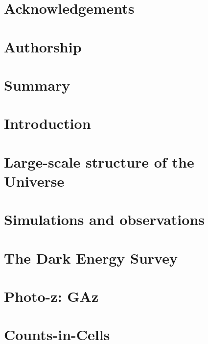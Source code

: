 \documentclass{book}%
\begin{document}
\frontmatter

\tableofcontents

\chapter{Acknowledgements}


\chapter{Authorship}



\chapter{Summary}


\mainmatter %

\chapter{Introduction}


\chapter{Large-scale structure of the Universe}
%

\chapter{Simulations and observations}
%

\chapter{The Dark Energy Survey}
%

\chapter{Photo-z: GAz}
%

\chapter{Counts-in-Cells}
%
\end{document}
